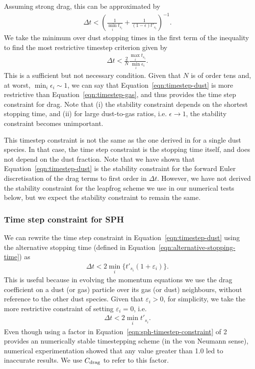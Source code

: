 \documentclass[fleqn,usenatbib]{mnras}
\begin{document}
%
Assuming strong drag, this can be approximated by
%
\begin{align}
   \Delta t < \left( \frac{1}{\min_i t_{s_i}}
      + \frac{1}{(1 - \epsilon) t'_{s_i}} \right)^{-1}.
\end{align}
%
We take the minimum over dust stopping times in the first term of the inequality
to find the most restrictive timestep criterion given by
%
\begin{align}
   \label{eqn:timestep-gas}
   \Delta t < \frac{2}{N} \frac{\max_i t_{s_i}}{\min_i \epsilon_i}.
\end{align}
%
This is a sufficient but not necessary condition. Given that \(N\) is of order
tens and, at worst, \(\min_i \epsilon_i \sim 1\), we can say that
Equation~\ref{eqn:timestep-dust} is more restrictive than
Equation~\ref{eqn:timestep-gas}, and thus provides the time step constraint for
drag. Note that (i) the stability constraint depends on the shortest stopping
time, and (ii) for large dust-to-gas ratios, i.e. \(\epsilon \rightarrow 1\),
the stability constraint becomes unimportant.

This timestep constraint is not the same as the one derived in
\citet{Laibe2012MNRAS.420.2345L} for a single dust species. In that case, the
time step constraint is the stopping time itself, and does not depend on the
dust fraction. Note that we have shown that Equation~\ref{eqn:timestep-dust} is
the stability constraint for the forward Euler discretisation of the drag terms
to first order in \(\Delta t\). However, we have not derived the stability
constraint for the leapfrog scheme we use in our numerical tests below, but we
expect the stability constraint to remain the same.

\subsubsection{Time step constraint for SPH}

We can rewrite the time step constraint in Equation~\ref{eqn:timestep-dust}
using the alternative stopping time
(defined in Equation~\ref{eqn:alternative-stopping-time}) as
%
\begin{align}
   \Delta t < 2 \min_i \{t'_{s_i} (1 + \varepsilon_i)\}.
\end{align}
%
This is useful because in evolving the momentum equations we use the drag
coefficient on a dust (or gas) particle over its gas (or dust) neighbours,
without reference to the other dust species. Given that \(\varepsilon_i > 0\),
for simplicity, we take the more restrictive constraint of setting
\(\varepsilon_i = 0\), i.e.
%
\begin{align}
   \label{eqn:sph-timestep-constraint}
   \Delta t < 2 \min_i t'_{s_i}.
\end{align}
%
Even though using a factor in Equation~\ref{eqn:sph-timestep-constraint} of 2
provides an numerically stable timestepping scheme (in the von Neumann sense),
numerical experimentation showed that any value greater than 1.0 led to
inaccurate results. We use \(C_{\rm drag}\) to refer to this factor.
\end{document}
